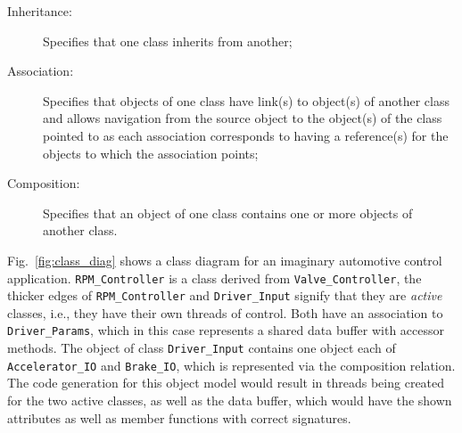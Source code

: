 \begin{description}
\item[Inheritance:]{Specifies that one class inherits from another;}
\item[Association:]{Specifies that objects of one class have link(s)
  to object(s) of another class and allows navigation from the source
  object to the object(s) of the class pointed to as each association
  corresponds to having a reference(s) for the objects to which the
  association points;}
\item[Composition:]{Specifies that an object of one class contains one
  or more objects of another class.}
\end{description}

Fig.~\ref{fig:class_diag} shows a class diagram for an imaginary
automotive control application. \texttt{RPM\_Controller} is a class
derived from \texttt{Valve\_Controller}, the thicker edges of
\texttt{RPM\_Controller} and \texttt{Driver\_Input} signify that they
are \emph{active} classes, i.e., they have their own threads of
control. Both have an association to \texttt{Driver\_Params}, which in
this case represents a shared data buffer with accessor methods. The
object of class \texttt{Driver\_Input} contains one object each of
\texttt{Accelerator\_IO} and \texttt{Brake\_IO}, which is represented
via the composition relation. The code generation for this object
model would result in threads being created for the two active
classes, as well as the data buffer, which would have the shown
attributes as well as member functions with correct signatures.

